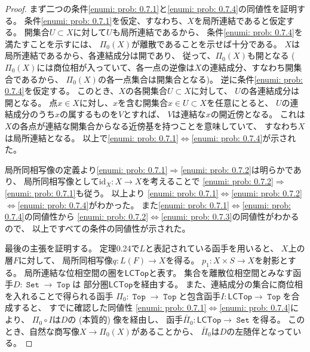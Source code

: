 \documentclass[uplatex]{jsarticle}
\theoremstyle{definition}
\def\id{\mathrm{id}}
\DeclareMathOperator{\sfSet}{\mathtt{Set}}
\DeclareMathOperator{\sfTop}{\mathtt{Top}}
\begin{document}
\begin{proof}
  まず二つの条件\ref{enumi: prob: 0.7.1}と\ref{enumi: prob: 0.7.4}の同値性を証明する。
  条件\ref{enumi: prob: 0.7.1}を仮定、すなわち、\(X\)を局所連結であると仮定する。
  開集合\(U\subset X\)に対して\(U\)も局所連結であるから、
  条件\ref{enumi: prob: 0.7.4}を満たすことを示すには、
  \(\Pi_0(X)\)が離散であることを示せば十分である。
  \(X\)は局所連結であるから、各連結成分は開であり、
  従って、\(\Pi_0(X)\)も開となる
  (\(\Pi_0(X)\)には商位相が入っていて、各一点の逆像は\(X\)の連結成分、すなわち開集合であるから、
  \(\Pi_0(X)\)の各一点集合は開集合となる)。
  逆に条件\ref{enumi: prob: 0.7.4}を仮定する。
  このとき、\(X\)の各開集合\(U\subset X\)に対して、
  \(U\)の各連結成分は開となる。
  点\(x\in X\)に対し、\(x\)を含む開集合\(x\in U\subset X\)を任意にとると、
  \(U\)の連結成分のうち\(x\)の属するものを\(V\)とすれば、
  \(V\)は連結な\(x\)の開近傍となる。
  これは\(X\)の各点が連結な開集合からなる近傍基を持つことを意味していて、
  すなわち\(X\)は局所連結となる。
  以上で\ref{enumi: prob: 0.7.1}\(\Leftrightarrow\)\ref{enumi: prob: 0.7.4}が示された。

  局所同相写像の定義より\ref{enumi: prob: 0.7.1}\(\Rightarrow\)\ref{enumi: prob: 0.7.2}は明らかであり、
  局所同相写像として\(\id_X:X\to X\)を考えることで
  \ref{enumi: prob: 0.7.2}\(\Rightarrow\)\ref{enumi: prob: 0.7.1}も従う。
  以上より
  \ref{enumi: prob: 0.7.1}\(\Leftrightarrow\)\ref{enumi: prob: 0.7.2}
  \(\Leftrightarrow\)\ref{enumi: prob: 0.7.4}がわかった。
  また\ref{enumi: prob: 0.7.1}\(\Leftrightarrow\)\ref{enumi: prob: 0.7.4}の同値性から
  \ref{enumi: prob: 0.7.2}\(\Leftrightarrow\)\ref{enumi: prob: 0.7.3}の同値性がわかるので、
  以上ですべての条件の同値性が示された。

  最後の主張を証明する。
  定理0.24で\(L\)と表記されている函手を用いると、
  \(X\)上の層\(F\)に対して、
  局所同相写像\(q:L(F)\to X\)を得る。
  \(p_1:X\times S \to X\)を射影とする。
  局所連結な位相空間の圏を\(\mathsf{LCTop}\)と表す。
  集合を離散位相空間とみなす函手\(D:\sfSet\to\sfTop\)は
  部分圏\(\mathsf{LCTop}\)を経由する。
  また、連結成分の集合に商位相を入れることで得られる函手
  \(\Pi_0:\sfTop\to\sfTop\)と包含函手\(I:\mathsf{LCTop}\to\sfTop\)を合成すると、
  すでに確認した同値性
  \ref{enumi: prob: 0.7.1}\(\Leftrightarrow\)\ref{enumi: prob: 0.7.4}により、
  \(\Pi_0\circ I\)は\(D\)の (本質的) 像を経由し、
  函手\(\bar{\Pi}_0 : \mathsf{LCTop}\to \sfSet\)を得る。
  このとき、自然な商写像\(X\to \Pi_0(X)\)があることから、
  \(\bar{\Pi}_0\)は\(D\)の左随伴となっている。


\end{proof}
\end{document}
